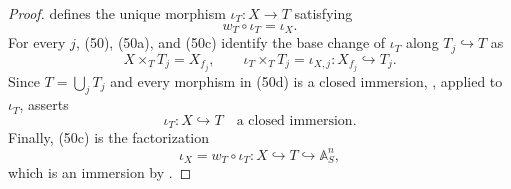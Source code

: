 \begin{proof}
  defines the unique morphism $\iota_T\colon X\to T$ satisfying
  \[
    w_T\circ\iota_T=\iota_X.                                    \tag{50c}
  \]
  For every $j$, (50), (50a), and (50c) identify the base change of
  $\iota_T$ along $T_j\hookrightarrow T$ as
  \[
    X\times_TT_j=X_{f_j},\qquad
    \iota_T\times_TT_j=\iota_{X,j}
      \colon X_{f_j}\hookrightarrow T_j.                         \tag{50d}
  \]
  Since $T=\bigcup_jT_j$ and every morphism in (50d) is a closed immersion,
  \cite[\href{https://stacks.math.columbia.edu/tag/01HL}{Tag 01HL}]
  {stacks-project}, applied to $\iota_T$, asserts
  \[
    \iota_T\colon X\hookrightarrow T\quad\text{a closed immersion}.
  \]
  Finally, (50c) is the factorization
  \[
    \iota_X
      =w_T\circ\iota_T
      \colon X\hookrightarrow T\hookrightarrow\mathbb A^n_S,
  \]
  which is an immersion by
  \cite[\href{https://stacks.math.columbia.edu/tag/01IO}{Tag 01IO}]
  {stacks-project}.
\end{proof}

